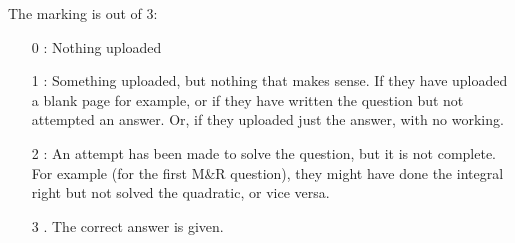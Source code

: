 \documentclass[11.5pt,sans,english]{article}
\begin{document}
The marking is out of 3:\\
\begin{itemize}
\item[0]: Nothing uploaded
\item[1]: Something uploaded, but nothing that makes sense. If they have uploaded a blank page for example, or if they have written the question but not attempted an answer. Or, if they uploaded just the answer, with no working.
\item[2]: An attempt has been made to solve the question, but it is not complete. For example (for the first M\&R question), they might have done the integral right but not solved the quadratic, or vice versa.
\item[3]. The correct answer is given.
\end{itemize}
\end{document}

